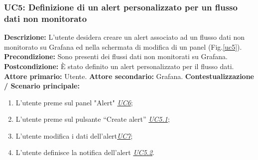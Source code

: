                    
                          
                \subsubsection{UC5: Definizione di un alert personalizzato per un flusso dati non monitorato}
                    \textbf{Descrizione:} L’utente desidera creare un alert associato ad un flusso dati non monitorato su Grafana ed nella schermata di modifica di un panel (Fig.\ref{uc5}).
                    \newline
                    \textbf{Precondizione:} Sono presenti dei flussi dati non monitorati su Grafana.
                    \newline
                    \textbf{Postcondizione:} È stato definito un alert personalizzato per il flusso dati.
                    \newline
                    \textbf{Attore primario:} Utente.
                    \newline
                    \textbf{Attore secondario:} Grafana.
                    \newline
                    \textbf{Contestualizzazione / Scenario principale:} \begin{enumerate}
                            \item L'utente preme sul panel "Alert" \underline{\textit{UC6}};
                            \item L’utente preme sul pulsante “Create alert” \underline{\textit{UC5.1}};
                            \item L'utente modifica i dati dell'alert\underline{\textit{UC7}};
                            \item L'utente definisce la notifica dell'alert \underline{\textit{UC5.2}}.
                        \end{enumerate}
                        
